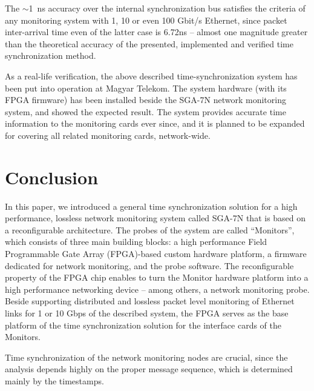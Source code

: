 \documentclass[journal]{IEEEtran}
\begin{document}
The $\sim$\SI{1}{\nano\second} accuracy over the internal synchronization bus satisfies the criteria of any monitoring system with 1, 10 or even 100 Gbit/s Ethernet, since packet inter-arrival time even of the latter case is 6.72ns \cite{6ns_interarrival} -- almost one magnitude greater than the theoretical accuracy of the presented, implemented and verified time synchronization method.

As a real-life verification, the above described time-synchronization system has been put into operation at Magyar Telekom. The system hardware (with its FPGA firmware) has been installed beside the SGA-7N network monitoring system, and showed the expected result. The system provides accurate time information to the monitoring cards ever since, and it is planned to be expanded for covering all related monitoring cards, network-wide.

\section{Conclusion}

In this paper, we introduced a general time synchronization solution for a high performance, lossless network monitoring system called SGA-7N that is based on a reconfigurable architecture. The probes of the system are called ``Monitors'', which consists of three main building blocks: a high performance Field Programmable Gate Array (FPGA)-based custom hardware platform, a firmware dedicated for network monitoring, and the probe software. The reconfigurable property of the FPGA chip enables to turn the Monitor hardware platform into a high performance networking device -- among others, a network monitoring probe. Beside supporting distributed and lossless packet level monitoring of Ethernet links for 1 or 10 Gbps of the described system, the FPGA serves as the base platform of the time synchronization solution for the interface cards of the Monitors.

Time synchronization of the network monitoring nodes are crucial, since the analysis depends highly on the proper message sequence, which is determined mainly by the timestamps.
\end{document}
